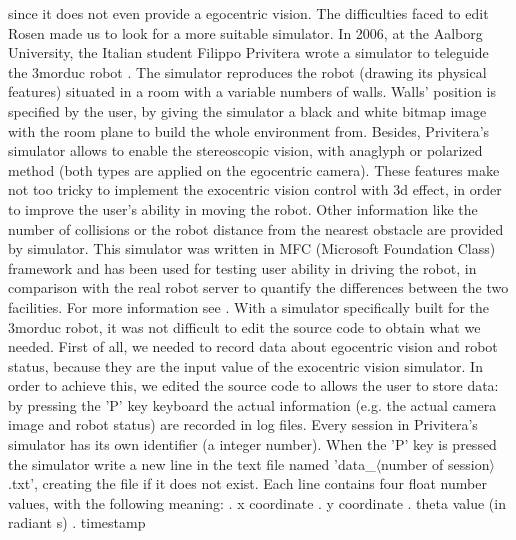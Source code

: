 since it does not even provide a egocentric vision. The difficulties faced to edit Rosen made us to look for a more suitable
simulator.
\newline In 2006, at the Aalborg University, the Italian student Filippo Privitera wrote a simulator to teleguide the
3morduc robot \cite{privitera}. The simulator reproduces the robot (drawing its physical features) situated in a room with a
variable numbers of walls. Walls' position is specified by the user, by giving the simulator a black and white bitmap image
with the room plane to build the whole environment from.
\newline Besides, Privitera's simulator allows to enable the stereoscopic vision, with anaglyph or polarized method (both 
types are applied on the egocentric camera). These features make not too tricky to implement the exocentric vision control with 3d
effect, in order to improve the user's ability in moving the robot. Other information like the number of collisions or the robot
distance from the nearest obstacle are provided by simulator.
\newline This simulator was written in MFC (Microsoft Foundation Class) framework and has been used for testing user ability in
driving the robot, in comparison with the real robot server to quantify the differences between the two facilities. For more
information see \cite{privitera}.
\newline With a simulator specifically built for the 3morduc robot, it was not difficult to edit the source code to obtain what we 
needed. First of all, we needed to record data about egocentric vision and robot status, because they are the input value 
of the exocentric vision simulator. In order to achieve this, we edited the source code to allows the user to store data: by
pressing the 'P' key keyboard the actual information (e.g. the actual camera image and robot status) are recorded in
log files.
\newline Every session in Privitera's simulator has its own identifier (a integer number). When the 'P' key is pressed the
simulator write a new line in the text file named 'data\_$\langle$number of session$\rangle$.txt', creating the file if it does
not exist. Each line contains four float number values, with the following meaning:
\newline
{}. x coordinate
. y coordinate
. theta value (in radiant s)
. timestamp
